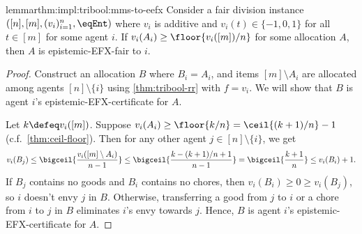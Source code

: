 \begin{restatable}{lemma}{rthm:impl:tribool:mms-to-eefx}
\label{thm:impl:tribool:mms-to-eefx}
Consider a fair division instance $([n], [m], (v_i)_{i=1}^n, \eqEnt)$
where $v_i$ is additive and $v_i(t) \in \{-1, 0, 1\}$ for all $t \in [m]$ for some agent $i$.
If $v_i(A_i) \ge \floor{v_i([m])/n}$ for some allocation $A$,
then $A$ is epistemic-EFX-fair to $i$.
\end{restatable}
\begin{proof}
Construct an allocation $B$ where $B_i = A_i$, and items $[m] \setminus A_i$
are allocated among agents $[n] \setminus \{i\}$ using \cref{thm:tribool-rr} with $f = v_i$.
We will show that $B$ is agent $i$'s epistemic-EFX-certificate for $A$.

Let $k \defeq v_i([m])$.
Suppose $v_i(A_i) \ge \floor{k/n} = \ceil{(k+1)/n} - 1$ (c.f.~\cref{thm:ceil-floor}).
Then for any other agent $j \in [n] \setminus \{i\}$, we get
\[ v_i(B_j) \le \bigceil{\frac{v_i([m] \setminus A_i)}{n-1}}
    \le \bigceil{\frac{k - (k+1)/n + 1}{n-1}} = \bigceil{\frac{k+1}{n}}
    \le v_i(B_i) + 1. \]
If $B_j$ contains no goods and $B_i$ contains no chores,
then $v_i(B_i) \ge 0 \ge v_i(B_j)$, so $i$ doesn't envy $j$ in $B$.
Otherwise, transferring a good from $j$ to $i$ or a chore from $i$ to $j$ in $B$
eliminates $i$'s envy towards $j$.
Hence, $B$ is agent $i$'s epistemic-EFX-certificate for $A$.
\end{proof}
